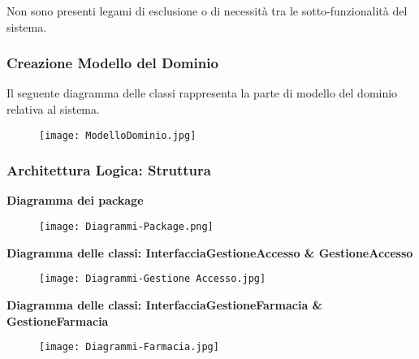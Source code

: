 \break
Non sono presenti legami di esclusione o di necessità tra le sotto-funzionalità del sistema. 
\hfill \break

\newpage
\subsubsection{Creazione Modello del Dominio}

Il seguente diagramma delle classi rappresenta la parte di modello del dominio relativa al sistema. \\

\begin{figure}[h!]
    \begin{center}
        \texttt{[image: ModelloDominio.jpg]}
    \end{center}
\end{figure}
\hfill \break

\newpage
\subsubsection{Architettura Logica: Struttura}
\hfill \break

\textbf{Diagramma dei package}
\hfill \break

\begin{figure}[h!]
    \begin{center}
        \texttt{[image: Diagrammi-Package.png]}
    \end{center}
\end{figure}
\hfill \break

\textbf{Diagramma delle classi: InterfacciaGestioneAccesso \& GestioneAccesso}
\hfill \break

\begin{figure}[h!]
    \begin{center}
        \texttt{[image: Diagrammi-Gestione Accesso.jpg]}
    \end{center}
\end{figure}
\hfill \break

\textbf{Diagramma delle classi: InterfacciaGestioneFarmacia \& GestioneFarmacia}
\hfill \break

\begin{figure}[h!]
    \begin{center}
        \texttt{[image: Diagrammi-Farmacia.jpg]}
    \end{center}
\end{figure}
\hfill \break

